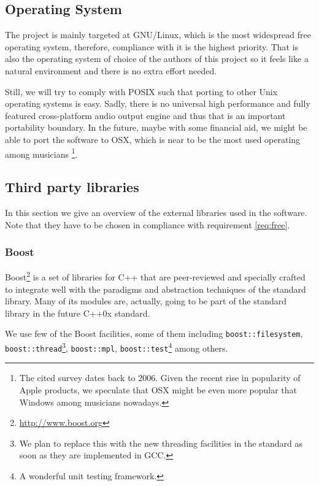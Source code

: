 \subsection{Operating System}

The project is mainly targeted at GNU/Linux, which is the most
widespread free operating system, therefore, compliance with it is the
highest priority. That is also the operating system of choice of the
authors of this project so it feels like a natural environment and
there is no extra effort needed.

Still, we will try to comply with POSIX such that porting to other
Unix operating systems is easy. Sadly, there is no universal high
performance and fully featured cross-platform audio output engine and
thus that is an important portability boundary. In the future, maybe
with some financial aid, we might be able to port the software to OSX,
which is near to be the most used operating among
musicians \cite{magnusson07acoustic}\footnote{The cited survey dates
  back to 2006. Given the recent rise in popularity of Apple products,
  we speculate that OSX might be even more popular that Windows among
  musicians nowadays.}.

\subsection{Third party libraries}

In this section we give an overview of the external libraries used in
the software. Note that they have to be chosen in compliance with
requirement \ref{req:free}.

\subsubsection{Boost}

Boost\footnote{\url{http://www.boost.org}} is a set of libraries for
C++ that are peer-reviewed and specially crafted to integrate well
with the paradigms and abstraction techniques of the standard
library. Many of its modules are, actually, going to be part of the
standard library in the future C++0x standard. 

We use few of the Boost facilities, some of them including
\texttt{boost::filesystem}, \texttt{boost::thread}\footnote{We plan to
replace this with the new threading facilities in the standard as soon
as they are implemented in GCC.},
\texttt{boost::mpl}, \texttt{boost::test}\footnote{A wonderful unit
  testing framework.} among others.

